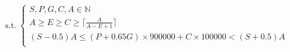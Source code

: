 \documentclass[preview]{standalone}
\begin{document}
\begin{align*}
\text{s.t.}~\begin{cases}S, P, G, C, A \in \mathbb{N} \\A \geq E \geq C \geq \lceil \frac{A}{A - E + 1} \rceil \\(S - 0.5)A \leq (P + 0.65 G) \times 900000 + C \times 100000 < (S + 0.5)A \\\end{cases}
\end{align*}
\end{document}
